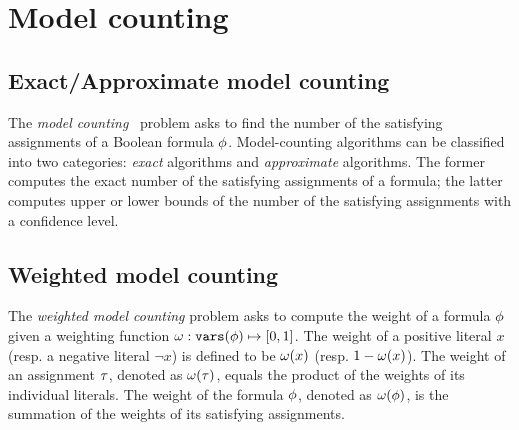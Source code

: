 \section{Model counting}
\label{sect:background-model-counting}

\subsection{Exact/Approximate model counting}
The \textit{model counting}~\cite{SATHandbook-ModelCounting} problem asks to find the number of the satisfying assignments of a Boolean formula $\phi$.
Model-counting algorithms can be classified into two categories:
\textit{exact} algorithms and \textit{approximate} algorithms.
The former computes the exact number of the satisfying assignments of a formula;
the latter computes upper or lower bounds of the number of the satisfying assignments with a confidence level.

\subsection{Weighted model counting}
The \textit{weighted model counting} problem asks to compute the weight of a formula $\phi$ given a weighting function $\omega:\texttt{vars}(\phi)\mapsto[0,1]$.
The weight of a positive literal $x$ (resp. a negative literal $\lnot x$) is defined to be $\omega(x)$ (resp. $1-\omega(x)$).
The weight of an assignment $\tau$, denoted as $\omega(\tau)$, equals the product of the weights of its individual literals.
The weight of the formula $\phi$, denoted as $\omega(\phi)$, is the summation of the weights of its satisfying assignments.